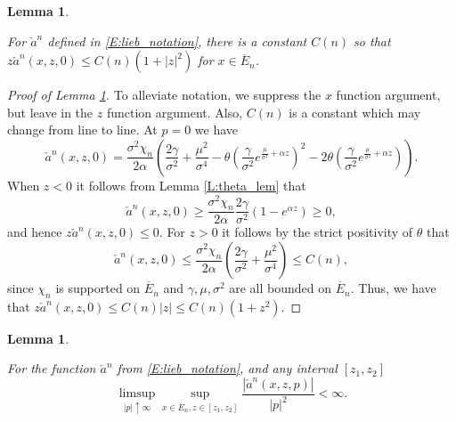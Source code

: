 \documentclass[11pt, letterpaper]{amsart}
\newtheorem{lemma}[theorem]{Lemma}
\theoremstyle{definition}
\theoremstyle{remark}
\numberwithin{equation}{section}
\newcommand{\ol}[1]{\overline{#1}}
\begin{document}

\begin{lemma}\label{L:lieb_a_bounds}

For $\check{a}^n$ defined in \eqref{E:lieb_notation}, there is a constant $C(n)$ so that $z\check{a}^n(x,z,0) \leq C(n)(1+|z|^2)$ for $x\in\ol{E}_n$.
\end{lemma}

\begin{proof}[Proof of Lemma \ref{L:lieb_a_bounds}]

To alleviate notation, we suppress the $x$ function argument, but leave in the $z$ function argument. Also, $C(n)$ is a constant which may change from line to line. At $p=0$ we have
\begin{equation}\label{E:a_at_p0}
\check{a}^n(x,z,0)  = \frac{\sigma^2\chi_n}{2\alpha}\left(\frac{2\gamma}{\sigma^2} + \frac{\mu^2}{\sigma^4} - \theta\left(\frac{\gamma}{\sigma^2}e^{\frac{\mu}{\sigma^2} +\alpha z}\right)^2 - 2\theta\left(\frac{\gamma}{\sigma^2}e^{\frac{\mu}{\sigma^2} +\alpha z }\right)\right).
\end{equation}
When $z<0$ it follows from Lemma \ref{L:theta_lem} that
\begin{equation*}
\check{a}^n(x,z,0) \geq \frac{\sigma^2\chi_n}{2\alpha}\frac{2\gamma}{\sigma^2}\left(1-e^{\alpha z}\right) \geq 0,
\end{equation*}
and hence $z \check{a}^n(x,z,0) \leq 0$.  For $z>0$ it follows by the strict positivity of $\theta$  that
\begin{equation*}
\check{a}^n(x,z,0) \leq \frac{\sigma^2 \chi_n}{2\alpha}\left(\frac{2\gamma}{\sigma^2} + \frac{\mu^2}{\sigma^4}\right) \leq C(n),
\end{equation*}
since $\chi_n$ is supported on $\ol{E}_n$ and $\gamma,\mu,\sigma^2$ are all bounded on $\ol{E}_n$.  Thus, we have that $z \check{a}^n(x,z,0)\leq C(n)|z| \leq C(n)(1+z^2)$.

\end{proof}


\begin{lemma}\label{L:lieb_a_Op}

For the function $\check{a}^n$ from \eqref{E:lieb_notation}, and any interval $[z_1,z_2]$
\begin{equation*}
\limsup_{|p|\uparrow\infty} \sup_{x\in\ol{E}_n, z\in [z_1,z_2]} \frac{|\check{a}^n(x,z,p)|}{|p|^2} < \infty.
\end{equation*}

\end{lemma}
\end{document}
